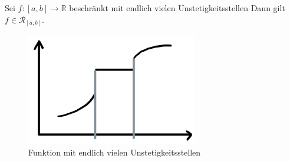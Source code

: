 \begin{Satz}{\label{kap10_satz21}
	Sei $f: [a,b] \rightarrow \mathbb{R}$ beschränkt mit endlich vielen 
	Unstetigkeitsstellen %
	Dann gilt $f \in \mathcal{R}_{[a,b]}$.\\
	\begin{figure}[ht]
		\begin{center}
			\includegraphics[scale=0.5]{Skizzen/plot_fkt_unstetigkeitsstellen}
		\end{center}
		\caption{Funktion mit endlich vielen Unstetigkeitsstellen}
		\label{plot_fkt_unstetigketsstellen}
	\end{figure}
}\end{Satz}

